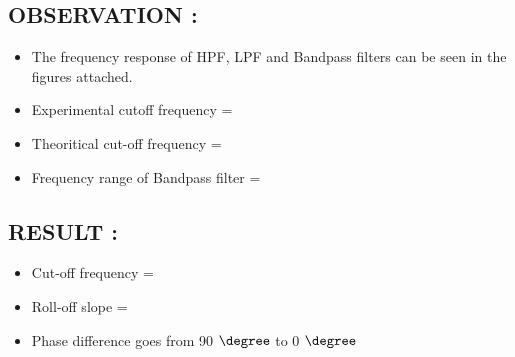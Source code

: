 \documentclass[12pt]{article}
\begin{document}
\subsection{\textbf{OBSERVATION : }}
\begin{itemize}
	\item The frequency response of HPF, LPF and Bandpass filters can be seen in the figures attached.
	\item Experimental cutoff frequency = 
	\item Theoritical cut-off frequency =
	\item Frequency range of Bandpass filter = 
\end{itemize}

\subsection{\textbf{RESULT} : }
\begin{itemize}
	\item Cut-off frequency =
	\item Roll-off slope = 
	\item Phase difference goes from 90 $\degree$ to 0 $\degree$ 
\end{itemize}
\end{document}
